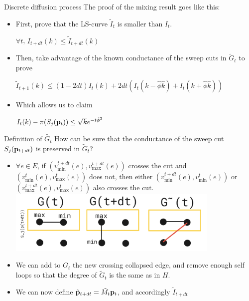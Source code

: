 \documentclass[../main.tex]{subfiles}
\begin{document}
	\begin{frame}{Discrete diffusion process}
		The proof of the mixing result goes like this:
		\begin{itemize}
				\item First, prove that the LS-curve $\tilde{I}_t$ is smaller than $I_t$. 
				\begin{lemma}
					\label{lemma:ls_curve_smaller_ls_curve_tilde}
					$\forall t$, 
					$I_{t+dt}(k) \leq \tilde{I}_{t+dt}(k)$
				\end{lemma} 
			\item Then, take advantage of the known conductance of the sweep cuts in $\tilde{G}_t$ to prove
				\begin{lemma}
					\label{lemma:recursive_LS_lower_bound}
					$\tilde{I}_{t+1}(k) \leq (1-2dt) I_t(k) + 2dt (I_t(k-\hat{\phi} \hat{k}) + I_t(k + \hat{\phi}\hat{k}))$
				\end{lemma}
			\item Which allows us to claim
				\begin{lemma}
					\label{lemma:mixing_result} 
					$I_t(k) - \pi(S_j(\bold{p}_t)) \leq \sqrt{k} e^{-t \hat{\phi}^2}$
				\end{lemma}
		\end{itemize}
	\end{frame}

	\begin{frame}{Definition of $\tilde{G_t}$}
		How can be sure that the conductance of the sweep cut $S_j(\bold{p}_{t+dt})$ is preserved in $\tilde{G}_t$?
		
		\begin{itemize}
			\item $\forall e\in E$, if $(v_{\text{min}}^{t+dt}(e), v_{\text{max}}^{t+dt}(e))$ crosses the cut and $(v_{\text{min}}^{t}(e), v_{\text{max}}^{t}(e))$ does not, then either $(v_{\text{min}}^{t+dt}(e), v_{\text{min}}^{t}(e))$ or $(v_{\text{max}}^{t+dt}(e), v_{\text{max}}^{t}(e))$ also crosses the cut.
			\includegraphics[width=0.8\textwidth]{Figures/G_tilde_creation}
			\item We can add to $G_t$ the new crossing collapsed edge, and remove enough self loops so that the degree of $\tilde{G}_t$ is the same as in $H$.
			\item We can now define $\tilde{\bold{p}}_{t+dt} = \tilde{M}_t \bold{p}_t$, and accordingly $\tilde{I}_{t+dt}$
		\end{itemize}
	\end{frame}
\end{document}
